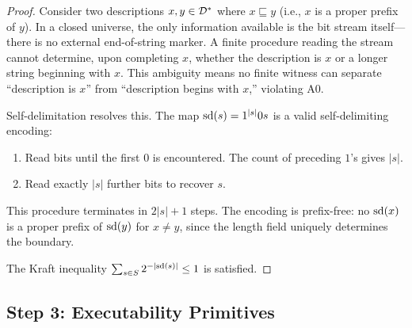 \begin{proof}
Consider two descriptions $x, y \in \mathcal{D}^*$ where $x \sqsubseteq y$
(i.e., $x$ is a proper prefix of $y$).  In a closed universe, the only
information available is the bit stream itself---there is no external
end-of-string marker.  A finite procedure reading the stream cannot
determine, upon completing $x$, whether the description is $x$ or a
longer string beginning with $x$.  This ambiguity means no finite
witness can separate ``description is $x$'' from ``description begins
with $x$,'' violating A0.

Self-delimitation resolves this.  The map $\mathrm{sd}(s) = 1^{|s|} 0 s$ is a
valid self-delimiting encoding:
\begin{enumerate}[nosep]
  \item Read bits until the first $0$ is encountered.  The count of
        preceding $1$'s gives $|s|$.
  \item Read exactly $|s|$ further bits to recover $s$.
\end{enumerate}
This procedure terminates in $2|s| + 1$ steps.  The encoding is
prefix-free: no $\mathrm{sd}(x)$ is a proper prefix of $\mathrm{sd}(y)$ for
$x \neq y$, since the length field uniquely determines the boundary.

The Kraft inequality $\sum_{s \in S} 2^{-|\mathrm{sd}(s)|} \leq 1$
\citep{kraft1949} is satisfied.

\end{proof}


\subsection{Step 3: Executability Primitives}\label{app:step3}

